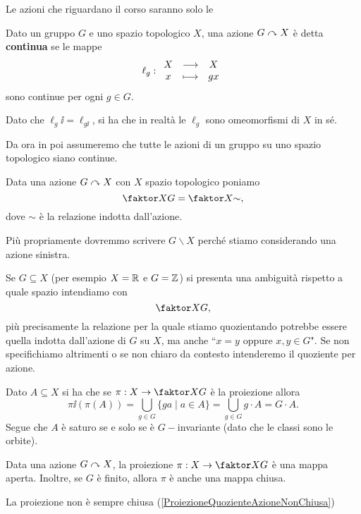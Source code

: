\begin{multicols*}{2}
\noindent
Le azioni che riguardano il corso saranno solo le
\begin{definition}
Dato un gruppo $G$ e uno spazio topologico $X$, una azione $G\curvearrowright X$ \`e detta \textbf{continua} se le mappe
\[\ell_g:\begin{array}{ccc} {X} & \longrightarrow & {X}\\ {x} & \longmapsto & {gx} \end{array}\]
sono continue per ogni $g\in G$.
\end{definition}
\begin{remark}
Dato che $\ell_g\ii=\ell_{g\ii}$, si ha che in realt\`a le $\ell_g$ sono omeomorfismi di $X$ in s\'e.
\end{remark}
\noindent Da ora in poi assumeremo che tutte le azioni di un gruppo su uno spazio topologico siano continue.
\begin{notation}
Data una azione $G\curvearrowright X$ con $X$ spazio topologico poniamo
\[\quot XG=\quot X\sim,\]
dove $\sim$ \`e la relazione indotta dall'azione.
\end{notation}
\begin{remark}
Pi\`u propriamente dovremmo scrivere $G\backslash X$ perch\'e stiamo considerando una azione sinistra.
\end{remark}
\begin{remark}
Se $G\subseteq X$ (per esempio $X=\mathbb{R}$ e $G=\mathbb{Z}$) si presenta una ambiguit\`a rispetto a quale spazio intendiamo con
\[\quot XG,\]
pi\`u precisamente la relazione per la quale stiamo quozientando potrebbe essere quella indotta dall'azione di $G$ su $X$, ma anche ``$x=y$ oppure $x,y\in G$". Se non specifichiamo altrimenti o se non chiaro da contesto intenderemo il quoziente per azione.
\end{remark}

\begin{remark}\label{CaratterizzazioneSaturiPerAzione}
Dato $A\subseteq X$ si ha che se $\pi:X\to\quot XG$ \`e la proiezione allora
\[\pi\ii(\pi(A))=\bigcup_{g\in G}\{ga\mid a\in A\}=\bigcup_{g\in G}g\cdot A=G\cdot A.\]
Segue che $A$ \`e saturo se e solo se \`e $G-$invariante (dato che le classi sono le orbite).
\end{remark}

\begin{proposition}\label{ProiezioniSonoApertePerQuozientePerAzioneEAncheChiuseGruppoFinito}
Data una azione $G\curvearrowright X$, la proiezione $\pi:X\to\quot XG$ \`e una mappa aperta.
Inoltre, se $G$ \`e finito, allora $\pi$ \`e anche una mappa chiusa.
\end{proposition}
\begin{remark}
La proiezione non \`e sempre chiusa (\ref{ProiezioneQuozienteAzioneNonChiusa})
\end{remark}


\end{multicols*}
